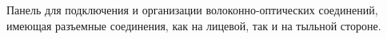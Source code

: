 Панель для подключения и организации волоконно-оптических соединений,
имеющая разъемные соединения, как на лицевой, так и на тыльной стороне.